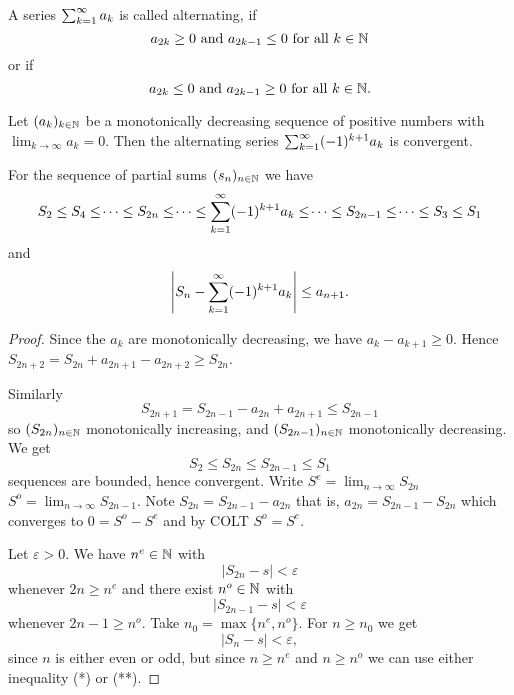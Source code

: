 \documentclass[10pt, a4paper]{article}
\newcommand{\dseq}[2][n]{(#2_#1)_{#1 \in \N}}
\begin{document}
\begin{definition}
    A series $\sum_{k = 1}^{\infty} a_k$ is called alternating,
    if
    \[
    a_{2k} \geq 0\text{ and } a_{2k - 1} \leq 0\text{ for all $k \in \mathbb{N}$}
    \]
    or if 
    \[
    a_{2k} \leq 0\text{ and } a_{2k - 1} \geq 0\text{ for all $k \in \mathbb{N}$}.
    \]
\end{definition}

\begin{theorem}
    Let $\dseq[k]{a}$ be a monotonically decreasing sequence of positive numbers with $\lim_{k \to \infty}a_k = 0$.
    Then the alternating series $\sum_{k = 1}^{\infty}(-1) ^ {k + 1}a_k$ is convergent.

    For the sequence of partial sums $\dseq{s}$ we have
    \[
    S_2 \leq S_4 \leq \dotsi \leq S_{2n} \leq \dotsi \leq \sum_{k = 1}^{\infty}(-1) ^ {k + 1}a_k \leq \dotsi \leq S_{2n - 1} \leq \dotsi \leq S_3 \leq S_1
    \]
    and
    \[
    \left|S_n - \sum_{k = 1}^{\infty}(-1) ^ {k + 1}a_k\right| \leq a_{n + 1}.
    \]
    \begin{proof}
        Since the $a_k$ are monotonically decreasing,
        we have $a_k - a_{k + 1} \geq 0$.
        Hence $S_{2n + 2} = S_{2n} + a_{2n + 1} - a_{2n + 2} \geq S_{2n}$.
        
        Similarly
        \[
        S_{2n + 1} = S_{2n - 1} - a_{2n} + a_{2n + 1} \leq S_{2n - 1}
        \]
        so $(S_{2n})_{n \in \mathbb{N}}$ monotonically increasing,
        and $(S_{2n - 1})_{n \in \mathbb{N}}$ monotonically decreasing.
        We get
        \[
        S_2 \leq S_{2n} \leq S_{2n - 1} \leq S_1
        \]
        sequences are bounded,
        hence convergent.
        Write $S ^ e = \lim_{n \to \infty}S_{2n}$
        $S ^ o = \lim_{n \to \infty}S_{2n - 1}$.
        Note $S_{2n} = S_{2n - 1} - a_{2n}$
        that is,
        $a_{2n} = S_{2n - 1} - S_{2n}$
        which converges to $0 = S ^ o - S ^ e$
        and by COLT
        $S ^ o = S ^ e$.

        Let $\varepsilon > 0$.
        We have $n ^ e \in \mathbb{N}$ with
        \begin{equation}\tag{*}
            |S_{2n} - s| < \varepsilon
        \end{equation}
        whenever $2n \geq n ^ e$ and there exist $n ^ o \in \mathbb{N}$ with
        \begin{equation}\tag{**}
            |S_{2n - 1} - s| < \varepsilon
        \end{equation}
        whenever $2n - 1 \geq n ^ o$.
        Take $n_0 = \max\{n ^ e, n ^ o\}$.
        For $n \geq n_0$ we get
        \[
        |S_n - s| < \varepsilon,
        \]
        since $n$ is either even or odd,
        but since $n \geq n ^ e$ and $n \geq n ^ o$ we can use either inequality (*) or (**).
    \end{proof}
\end{theorem}
\end{document}
